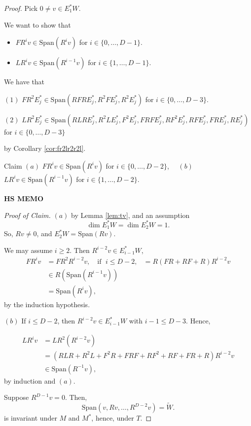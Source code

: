 \documentclass[
]{book}
\providecommand{\tightlist}{%
  \setlength{\itemsep}{0pt}\setlength{\parskip}{0pt}}
\theoremstyle{definition}
\theoremstyle{definition}
\theoremstyle{definition}
\theoremstyle{definition}
\theoremstyle{remark}
\begin{document}
\begin{proof}
Pick \(0\neq v\in E^*_1W\).

We want to show that

\begin{itemize}
\tightlist
\item
  \(FR^iv \in \mathrm{Span}(R^iv)\) for \(i\in \{0, \ldots, D-1\}\).
\item
  \(LR^iv \in \mathrm{Span}(R^{i-1}v)\) for \(i\in \{1, \ldots, D-1\}\).
\end{itemize}

We have that

\((1)\) \(FR^2E^*_j \in \mathrm{Span}(RFRE^*_j, R^2FE^*_j, R^2E^*_j)\) for \(i\in \{0, \ldots, D-3\}\).

\((2)\) \(LR^2E^*_j \in \mathrm{Span}(RLRE^*_j, R^2LE^*_j, F^2E^*_j, FRFE^*_j, RF^2E^*_j, RFE^*_j, FRE^*_j, RE^*_j)\) for \(i\in \{0, \ldots, D-3\}\)

by Corollary \ref{cor:fr2lr2r2l}.

Claim \((a)\) \(FR^iv \in \mathrm{Span}(R^iv)\) for \(i\in \{0, \ldots, D-2\}\),
\(\quad (b)\) \(LR^iv \in \mathrm{Span}(R^{i-1}v)\) for \(i\in \{1, \ldots, D-2\}\).

\textbf{HS MEMO}

\emph{Proof of Claim.}
\textbar{} \((a)\) by Lemma \ref{lem:tv}, and an assumption
\[\dim E^*_1W = \dim E^*_2W = 1.\]
So, \(Rv\neq 0\), and \(E^*_2W = \mathrm{Span}(Rv)\).

We may assume \(i\geq 2\). Then \(R^{i-2}v \in E^*_{i-1}W\),
\begin{align}
FR^iv & = FR^2R^{i-2}v, \quad \text{if }\; i\leq D-2,
& = R(FR + RF + R)R^{i-2}v\\
& \in R(\mathrm{Span}(R^{i-1}v)) \\
& = \mathrm{Span}(R^iv),
\end{align}
by the induction hypothesis.

\((b)\) If \(i\leq D-2\), then \(R^{i-2}v\in E^*_{i-1}W\) with \(i-1\leq D-3\). Hence,

\begin{align}
LR^iv &= LR^2(R^{i-2}v)\\
& = (RLR + R^2L + F^2R + FRF + RF^2 + RF + FR + R)R^{i-2}v\\
& \in \mathrm{Span}(R^{-1}v),
\end{align}
by induction and \((a)\).

Suppose \(R^{D-1}v = 0\). Then,
\[\mathrm{Span}(v, Rv, \ldots, R^{D-2}v) = \widetilde{W}.\]
is invariant under \(M\) and \(M^*\), hence, under \(T\).


\end{proof}
\end{document}
